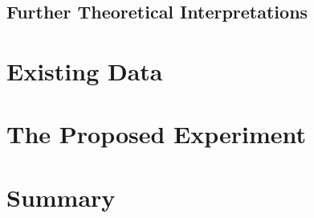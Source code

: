 \documentclass[11pt]{article}
\begin{document}
\subsection{Further Theoretical Interpretations}
  


\clearpage
\section{Existing Data}
 
  
\clearpage
\section{The Proposed Experiment}

%



%

%


\section{Summary}
  
\clearpage

 
\scriptsize
%
\normalsize
\end{document}
